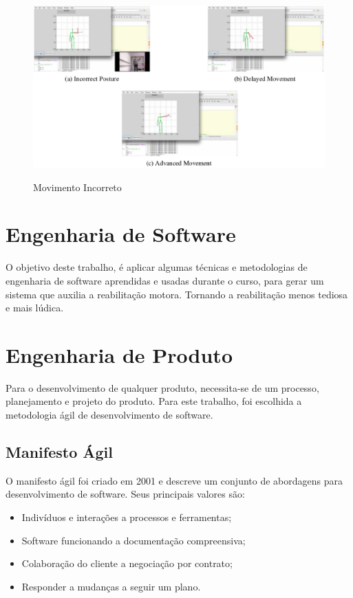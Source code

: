 \begin{figure}[!h]
\centering
\includegraphics [keepaspectratio=true,scale=0.60]{figuras/movimentoIncorreto.eps}

\caption{Movimento Incorreto}
\cite{roberto}
\label{movimentoIncorreto}
\end{figure}

\section{Engenharia de Software}\label{sec:engenhariaSoft}
\label{sec:ContextoESW}
  O objetivo deste trabalho, é aplicar algumas técnicas e metodologias de engenharia de software  aprendidas e usadas durante o curso,
para gerar um sistema que auxilia a reabilitação motora. Tornando a reabilitação menos tediosa e mais lúdica.

\section{Engenharia de Produto}\label{sec:engenhariaProd}
\label{sec:Engenharia de Produto}
  Para o desenvolvimento de qualquer produto, necessita-se de um processo,
planejamento e projeto do produto. Para este trabalho, foi escolhida a
metodologia ágil de desenvolvimento de software.
\subsection{Manifesto Ágil}
\label{sec:Manifesto Ágil}
  O manifesto ágil foi criado em 2001 e descreve um conjunto de abordagens para
desenvolvimento de software.
  Seus principais valores são:
  \begin{itemize}
  \item Indivíduos e interações a processos e ferramentas;
  \item Software funcionando a documentação compreensiva;
  \item Colaboração do cliente a negociação por contrato;
  \item Responder a mudanças a seguir um plano.\cite{manifestoAgil}
  \end{itemize}

